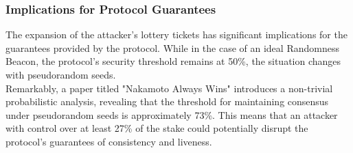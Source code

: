\subsubsection{Implications for Protocol Guarantees}
The expansion of the attacker's lottery tickets has significant implications for the guarantees provided by the protocol. While in the case of an ideal Randomness Beacon, the protocol's security threshold remains at 50\%, the situation changes with pseudorandom seeds.\\
Remarkably, a paper titled "Nakamoto Always Wins" introduces a non-trivial probabilistic analysis, revealing that the threshold for maintaining consensus under pseudorandom seeds is approximately 73\%. This means that an attacker with control over at least 27\% of the stake could potentially disrupt the protocol's guarantees of consistency and liveness.
